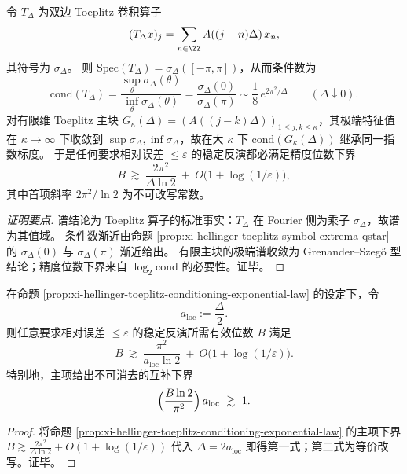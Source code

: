 \begin{proposition}\label{prop:xi-hellinger-toeplitz-conditioning-exponential-law}
令 \(T_\Delta\) 为双边 Toeplitz 卷积算子
\[
(T_\Delta x)_j=\sum_{n\in\ZZ}A((j-n)\Delta)\,x_n,
\]
其符号为 \(\sigma_\Delta\)。
则 \(\mathrm{Spec}(T_\Delta)=\sigma_\Delta([-\pi,\pi])\)，从而条件数为
\[
\mathrm{cond}(T_\Delta)=\frac{\sup_\theta\sigma_\Delta(\theta)}{\inf_\theta\sigma_\Delta(\theta)}
=\frac{\sigma_\Delta(0)}{\sigma_\Delta(\pi)}
\sim \frac18\,e^{2\pi^2/\Delta}\qquad(\Delta\downarrow 0).
\]
对有限维 Toeplitz 主块 \(G_\kappa(\Delta)=(A((j-k)\Delta))_{1\le j,k\le\kappa}\)，其极端特征值在 \(\kappa\to\infty\) 下收敛到 \(\sup\sigma_\Delta,\inf\sigma_\Delta\)，故在大 \(\kappa\) 下 \(\mathrm{cond}(G_\kappa(\Delta))\) 继承同一指数标度。
于是任何要求相对误差 \(\le\varepsilon\) 的稳定反演都必满足精度位数下界
\[
B\ \gtrsim\ \frac{2\pi^2}{\Delta\ln 2}\ +\ O\bigl(1+\log(1/\varepsilon)\bigr),
\]
其中首项斜率 \(2\pi^2/\ln2\) 为不可改写常数。
\end{proposition}
\begin{proof}[证明要点]
谱结论为 Toeplitz 算子的标准事实：\(T_\Delta\) 在 Fourier 侧为乘子 \(\sigma_\Delta\)，故谱为其值域。
条件数渐近由命题 \ref{prop:xi-hellinger-toeplitz-symbol-extrema-qstar} 的 \(\sigma_\Delta(0)\) 与 \(\sigma_\Delta(\pi)\) 渐近给出。
有限主块的极端谱收敛为 Grenander--Szeg\H{o} 型结论；精度位数下界来自 \(\log_2\mathrm{cond}\) 的必要性。证毕。
\end{proof}

\begin{corollary}[精度--局域互补常数]\label{cor:xi-hellinger-toeplitz-precision-local-complementarity}
在命题 \ref{prop:xi-hellinger-toeplitz-conditioning-exponential-law} 的设定下，令
\[
a_{\mathrm{loc}}:=\frac{\Delta}{2}.
\]
则任意要求相对误差 \(\le\varepsilon\) 的稳定反演所需有效位数 \(B\) 满足
\[
B\ \gtrsim\ \frac{\pi^2}{a_{\mathrm{loc}}\ln 2}\ +\ O\bigl(1+\log(1/\varepsilon)\bigr).
\]
特别地，主项给出不可消去的互补下界
\[
\Bigl(\frac{B\ln 2}{\pi^2}\Bigr)\,a_{\mathrm{loc}}\ \gtrsim\ 1.
\]
\end{corollary}
\begin{proof}
将命题 \ref{prop:xi-hellinger-toeplitz-conditioning-exponential-law} 的主项下界
\(
B\gtrsim \frac{2\pi^2}{\Delta\ln 2}+O(1+\log(1/\varepsilon))
\)
代入 \(\Delta=2a_{\mathrm{loc}}\) 即得第一式；第二式为等价改写。证毕。
\end{proof}


